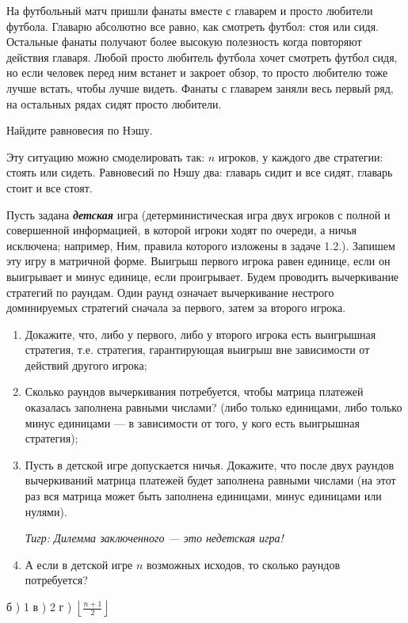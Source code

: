 \begin{problem}
На футбольный матч пришли фанаты вместе с главарем и просто любители футбола. Главарю абсолютно все равно, как смотреть футбол: стоя или сидя. Остальные фанаты получают более высокую полезность когда повторяют действия главаря. Любой просто любитель футбола хочет смотреть футбол сидя, но если человек перед ним встанет и закроет обзор, то просто любителю тоже лучше встать, чтобы лучше видеть. Фанаты с главарем заняли весь первый ряд, на остальных рядах сидят просто любители.\par
Найдите равновесия по Нэшу.

\begin{sol}
Эту ситуацию можно смоделировать так: $n$ игроков, у каждого две стратегии: стоять или сидеть. Равновесий по Нэшу два: главарь сидит и все сидят, главарь стоит и все стоят.
\end{sol}
\end{problem}



\begin{problem}[Детские игры \cite{ewerhart:clg}] %
Пусть задана {\bf {\it детская}} игра (детерминистическая игра двух игроков с полной и совершенной информацией, в которой игроки ходят по очереди, а ничья исключена; например, Ним, правила которого изложены в задаче 1.2.). Запишем эту игру в матричной форме. Выигрыш первого игрока равен единице, если он выигрывает и минус единице, если проигрывает. Будем проводить вычеркивание стратегий по раундам. Один раунд означает вычеркивание нестрого доминируемых стратегий сначала за первого, затем за второго игрока.\par
\begin{enumerate}
\item 	Докажите, что, либо у первого, либо у второго игрока есть выигрышная стратегия, т.е. стратегия, гарантирующая выигрыш вне зависимости от действий другого игрока;\par
\item 	Сколько раундов вычеркивания потребуется, чтобы матрица платежей оказалась заполнена равными числами? (либо только единицами, либо только минус единицами --- в зависимости от того, у кого есть выигрышная стратегия);\par
\item 	Пусть в детской игре допускается ничья. Докажите, что после двух раундов вычеркиваний матрица платежей будет заполнена равными числами (на этот раз вся матрица может быть заполнена единицами, минус единицами или нулями).\par
{\it Тигр: Дилемма заключенного --- это недетская игра!}\par

\item А если в детской игре $n$ возможных исходов, то сколько раундов потребуется?
\end{enumerate}


\begin{sol}
б ) 1 
в ) 2 
г ) $\left\lfloor  \frac{n+1}{2} \right\rfloor$
\end{sol}
\end{problem}


